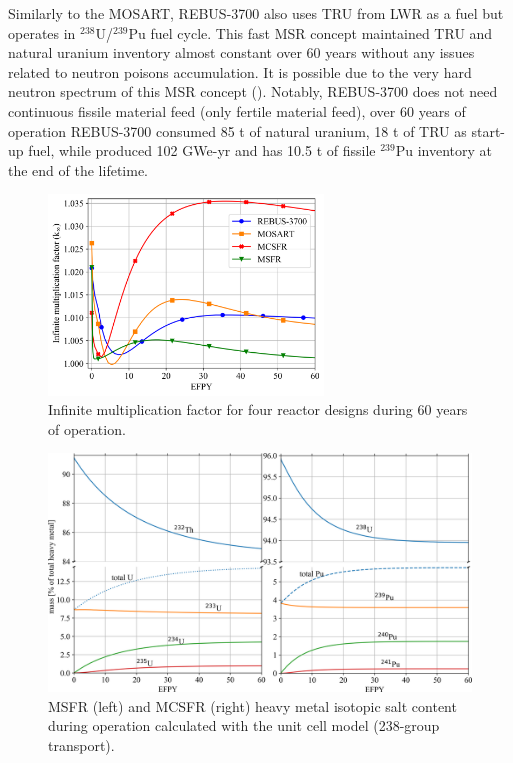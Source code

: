 \documentclass[letterpaper]{mandc2019}
\begin{document}
Similarly to the \gls{MOSART}, REBUS-3700 also uses TRU from \gls{LWR} as a fuel but operates in $^{238}$U/$^{239}$Pu fuel cycle. This fast \gls{MSR} concept maintained  TRU and natural uranium inventory almost constant over 60 years without any issues related to neutron poisons accumulation. It is possible due to the very hard neutron spectrum of this \gls{MSR} concept (). Notably, REBUS-3700 does not need continuous fissile material feed (only fertile material feed), over 60 years of operation REBUS-3700 consumed 85 t of natural uranium, 18 t of TRU as start-up fuel, while produced 102 GWe-yr and has 10.5 t of fissile $^{239}$Pu inventory at the end of the lifetime. 
\begin{figure}[!htb]
  \centering
  \vspace{-0.3in}
  \includegraphics[width=0.65\textwidth]{./Figures/k_inf.png}
	  \vspace{-0.15in}
  \caption{Infinite multiplication factor for four reactor designs during 60 years of operation.}
  \label{fig:k_inf}
    \vspace{-0.4in}
\end{figure}
\begin{figure}[!htb]
  \centering
  \includegraphics[width=\textwidth]{./Figures/msfr_mcsfr_balance.png}
	  \vspace{-0.2in}
  \caption{\gls{MSFR} (left) and \gls{MCSFR} (right) heavy metal isotopic salt content during operation calculated with the unit cell model (238-group transport).}
  \label{fig:msfr-u-balance}
    \vspace{-0.5in}
\end{figure}
\end{document}
